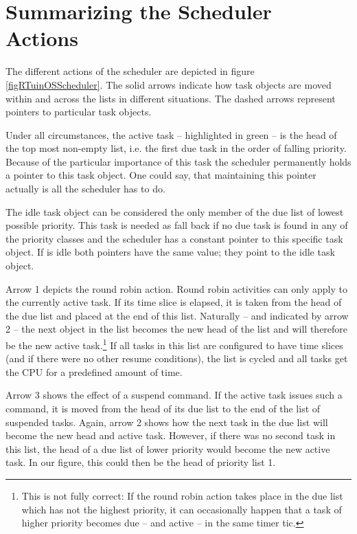 \section{Summarizing the Scheduler Actions}


The different actions of the scheduler are depicted in figure
\ref{figRTuinOSScheduler}. The solid arrows indicate how task objects are
moved within and across the lists in different situations. The dashed
arrows represent pointers to particular task objects.

Under all circumstances, the active task -- highlighted in green -- is the
head of the top most non-empty list, i.e. the first due task in the order
of falling priority. Because of the particular importance of this task the
scheduler permanently holds a pointer to this task object. One could say,
that maintaining this pointer actually is all the scheduler has to do.

The idle task object can be considered the only member of the due list of
lowest possible priority. This task is needed as fall back if no due task
is found in any of the priority classes and the scheduler has a constant
pointer to this specific task object. If \rtos{} is idle both pointers have
the same value; they point to the idle task object.

Arrow 1 depicts the round robin action. Round robin activities can only
apply to the currently active task. If its time slice is elapsed, it is
taken from the head of the due list and placed at the end of this list.
Naturally -- and indicated by arrow 2 -- the next object in the list
becomes the new head of the list and will therefore be the new active
task.\footnote{This is not fully correct: If the round robin action takes
place in the due list which has not the highest priority, it can
occasionally happen that a task of higher priority becomes due -- and
active -- in the same timer tic.} If all tasks in this list are configured
to have time slices (and if there were no other resume conditions), the
list is cycled and all tasks get the CPU for a predefined amount of time.

Arrow 3 shows the effect of a suspend command. If the active task issues
such a command, it is moved from the head of its due list to the end of
the list of suspended tasks. Again, arrow 2 shows how the next task in the
due list will become the new head and active task. However, if there was
no second task in this list, the head of a due list of lower priority
would become the new active task. In our figure, this could then be the
head of priority list 1.

